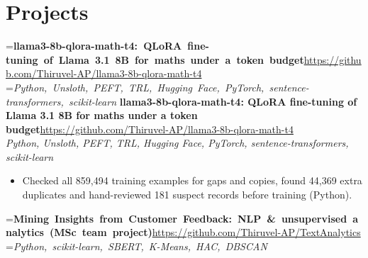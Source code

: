 \documentclass[a4paper,11pt]{article}
\newcommand{\project}[3]{%
  \textbf{#1}\hfill#3\\ {\color{muted}\small\textit{#2}}\par}
\newcommand{\gap}{\vspace{5pt}}
\begin{document}
\section{Projects}
=\hbox{\textbf{llama3-8b-qlora-math-t4: QLoRA fine-tuning of Llama 3.1 8B for maths under a token budget}\hspace{1em}\url{https://github.com/Thiruvel-AP/llama3-8b-qlora-math-t4}}%
=\hbox{{\small\textit{Python, Unsloth, PEFT, TRL, Hugging Face, PyTorch, sentence-transformers, scikit-learn}}}%
\ifdim\wd0>\linewidth
\ifdim\wd2>\linewidth
\textbf{llama3-8b-qlora-math-t4: QLoRA fine-tuning of Llama 3.1 8B for maths under a token budget}\\ {\color{muted}\small\textit{Python, Unsloth, PEFT, TRL, Hugging Face, PyTorch, sentence-transformers, scikit-learn}}\\ \hspace*{\fill}{\small\url{https://github.com/Thiruvel-AP/llama3-8b-qlora-math-t4}}\par
\else
\textbf{llama3-8b-qlora-math-t4: QLoRA fine-tuning of Llama 3.1 8B for maths under a token budget}\\ {\color{muted}\small\textit{Python, Unsloth, PEFT, TRL, Hugging Face, PyTorch, sentence-transformers, scikit-learn}}\hfill{\small\url{https://github.com/Thiruvel-AP/llama3-8b-qlora-math-t4}}\par
\fi
\else
\project{llama3-8b-qlora-math-t4: QLoRA fine-tuning of Llama 3.1 8B for maths under a token budget}{Python, Unsloth, PEFT, TRL, Hugging Face, PyTorch, sentence-transformers, scikit-learn}{\url{https://github.com/Thiruvel-AP/llama3-8b-qlora-math-t4}}
\fi
\begin{itemize}
  \item Checked all 859,494 training examples for gaps and copies, found 44,369 extra duplicates and hand-reviewed 181 suspect records before training (Python).
\end{itemize}
\gap
{}
=\hbox{\textbf{Mining Insights from Customer Feedback: NLP \& unsupervised analytics (MSc team project)}\hspace{1em}\url{https://github.com/Thiruvel-AP/TextAnalytics}}%
=\hbox{{\small\textit{Python, scikit-learn, SBERT, K-Means, HAC, DBSCAN}}}%
\end{document}
